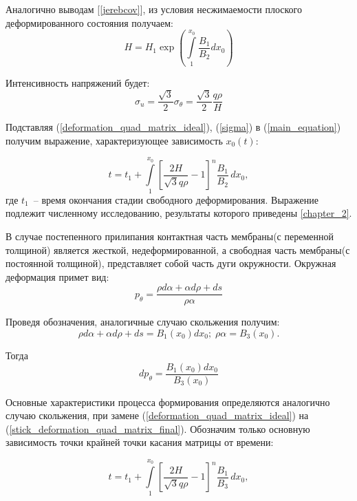  Аналогично выводам [\ref{jerebcov}], из условия несжимаемости плоского деформированного состояния получаем:
 \begin{equation}
 H=H_1\exp\left(\int\limits_1^{x_0}\dfrac{B_1}{B_2}dx_0\right)
  \label{quad_matrix_h}
 \end{equation}
 
 Интенсивность напряжений будет:
 \begin{equation}
 \sigma_u = \dfrac{\sqrt 3}{2}\sigma_\theta = \dfrac{\sqrt 3}{2}\dfrac{q\rho}{H}
 \label{sigma}
 \end{equation}
 
 Подставляя (\ref{deformation_quad_matrix_ideal}), (\ref{sigma}) в (\ref{main_equation}) получим выражение, характеризующее зависимость $x_0(t)$:
 
 \begin{equation}
   t = t_1 + \int\limits^{x_0}_1 \left[ \dfrac{2H}{\sqrt3 q \rho} -1\right]^n\dfrac{B_1}{B_2}\,dx_0,
   \end{equation}
где $t_1$~-- время окончания стадии свободного деформирования.   
Выражение подлежит численному исследованию, результаты которого приведены \ref{chapter_2}.

В случае постепенного прилипания контактная часть мембраны(с переменной толщиной)
является жесткой, недеформированной, а свободная часть мембраны(с постоянной толщиной), представляет собой часть дуги окружности.
Окружная деформация примет вид:
\begin{equation}
p_\theta = \dfrac{\rho d\alpha +\alpha d\rho+ds}{\rho\alpha}
\label{stick_deformation_quad_matrix}
\end{equation}

Проведя обозначения, аналогичные случаю скольжения получим: 
\begin{equation}
\rho d\alpha + \alpha d\rho +ds = B_1(x_0)dx_0;\; \rho\alpha = B_3(x_0).
\end{equation}

Тогда 
\begin{equation}
	dp_\theta = \dfrac{B_1(x_0)dx_0}{B_3(x_0)}
\label{stick_deformation_quad_matrix_final}
\end{equation}

Основные характеристики процесса формирования определяются аналогично случаю скольжения, при замене (\ref{deformation_quad_matrix_ideal}) 
на (\ref{stick_deformation_quad_matrix_final}). Обозначим только основную зависимость точки крайней точки касания матрицы от времени:

 \begin{equation}
   t = t_1 + \int\limits^{x_0}_1 \left[ \dfrac{2H}{\sqrt3 q \rho} -1\right]^n\dfrac{B_1}{B_3}\,dx_0,
   \end{equation}
